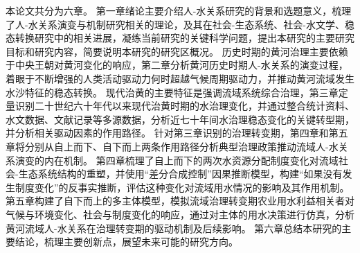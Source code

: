 本论文共分为六章。
第一章绪论主要介绍人-水关系研究的背景和选题意义，梳理了人-水关系演变与机制研究相关的理论，及其在社会-生态系统、社会-水文学、稳态转换研究中的相关进展，凝练当前研究的关键科学问题，提出本研究的主要研究目标和研究内容，简要说明本研究的研究区概况。
历史时期的黄河治理主要依赖于中央王朝对黄河变化的响应，第二章分析黄河历史时期人-水关系的演变过程，着眼于不断增强的人类活动驱动力何时超越气候周期驱动力，并推动黄河流域发生水沙特征的稳态转换。
现代治黄的主要特征是强调流域系统综合治理，第三章定量识别二十世纪六十年代以来现代治黄时期的水治理变化，并通过整合统计资料、水文数据、文献记录等多源数据，分析近七十年间水治理稳态变化的关键转型期，并分析相关驱动因素的作用路径。
针对第三章识别的治理转变期，第四章和第五章将分别从自上而下、自下而上两条作用路径分析典型治理政策推动流域人-水关系演变的内在机制。
第四章梳理了自上而下的两次水资源分配制度变化对流域社会-生态系统结构的重塑，并使用“差分合成控制”因果推断模型，构建“如果没有发生制度变化”的反事实推断，评估这种变化对流域用水情况的影响及其作用机制。
第五章构建了自下而上的多主体模型，模拟流域治理转变期农业用水利益相关者对气候与环境变化、社会与制度变化的响应，通过对主体的用水决策进行仿真，分析黄河流域人-水关系在治理转变期的驱动机制及后续影响。
第六章总结本研究的主要结论，梳理主要创新点，展望未来可能的研究方向。